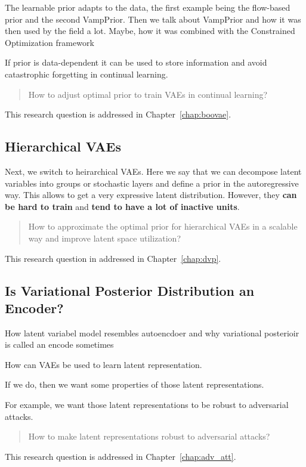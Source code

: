 The learnable prior adapts to the data, the first example being the flow-based prior and the second VampPrior.
Then we talk about VampPrior and how it was then used by the field a lot. 
Maybe, how it was combined with the Constrained Optimization framework

If prior is data-dependent it can be used to store information and avoid catastrophic forgetting in continual learning.



\begin{quote}
	How  to adjust optimal prior to train VAEs in continual learning?
\end{quote}
This research question is addressed in Chapter~\ref{chap:boovae}.

\subsection{Hierarchical VAEs}
Next, we switch to heirarchical VAEs. Here we say that we can decompose latent variables into groups or stochastic layers and define a prior in the autoregressive way. This allows to get a very expressive latent distribution. However, they \textbf{can be hard to train} and \textbf{tend to have a lot of inactive units}.


\begin{quote}
	How  to approximate the optimal prior for hierarchical VAEs in a scalable way and improve latent space utilization?
\end{quote}
This research question in addressed in Chapter~\ref{chap:dvp}.

\subsection{Is Variational Posterior Distribution an Encoder?}
How latent variabel model resembles autoencdoer and why variational posterioir is called an encode sometimes

How can VAEs be used to learn latent representation. 

If we do, then we want some properties of those latent representations. 

For example, we want those latent representations to be robust to adversarial attacks. 
\begin{quote}
	How  to make latent representations robust to adversarial attacks?
\end{quote}
This research question is addressed in Chapter~\ref{chap:adv_att}.


